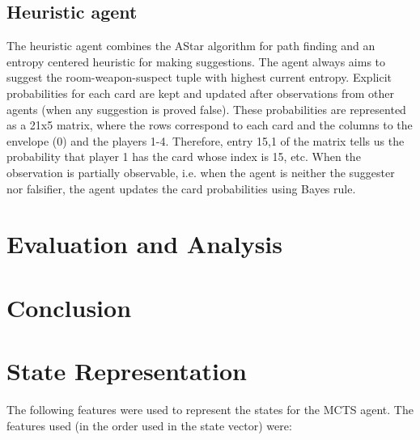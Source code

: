 \documentclass[msc, deptreport, ai, romanprepages]{infthesis}
\begin{document}
\section{Heuristic agent}
The heuristic agent combines the AStar algorithm for path finding and an entropy centered heuristic for making suggestions. The agent always aims to suggest the room-weapon-suspect tuple with highest current entropy. Explicit probabilities for each card are kept and updated after observations from other agents (when any suggestion is proved false). These probabilities are represented as a 21x5 matrix, where the rows correspond to each card and the columns to the envelope (0) and the players 1-4. Therefore, entry 15,1 of the matrix tells us the probability that player 1 has the card whose index is 15, etc. When the observation is partially observable, i.e. when the agent is neither the suggester nor falsifier, the agent updates the card probabilities using Bayes rule.

\chapter{Evaluation and Analysis}

\chapter{Conclusion}

\appendix
\chapter{State Representation}
The following features were used to represent the states for the MCTS agent. The features used (in the order used in the state vector) were:
\end{document}
